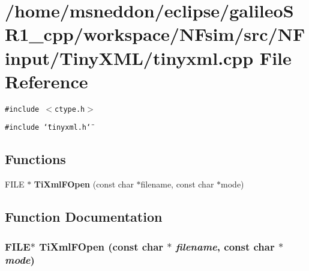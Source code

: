 \section{/home/msneddon/eclipse/galileoSR1\_\-cpp/workspace/NFsim/src/NFinput/TinyXML/tinyxml.cpp File Reference}
\label{tinyxml_8cpp}


{\tt \#include $<$ctype.h$>$}\par
{\tt \#include \char`\"{}tinyxml.h\char`\"{}}\par
\subsection*{Functions}
\begin{CompactItemize}
\item 
FILE $\ast$ {\bf TiXmlFOpen} (const char $\ast$filename, const char $\ast$mode)
\end{CompactItemize}


\subsection{Function Documentation}
\subsubsection{\setlength{\rightskip}{0pt plus 5cm}FILE$\ast$ TiXmlFOpen (const char $\ast$ {\em filename}, const char $\ast$ {\em mode})}\label{tinyxml_8cpp_72fac93bfb73cb50c2bfb3f9c8520557}


